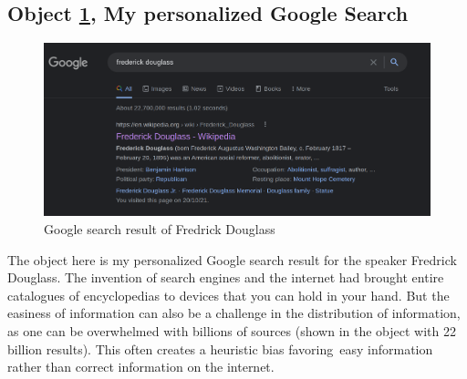 \documentclass[a4paper,11pt]{article}
\begin{document}




\subsection*{Object \ref{fig:download}, My personalized Google Search}

\begin{figure}[h!]
 \centering
 \includegraphics[scale=0.25]{douglass.png}
 \caption{Google search result of Fredrick Douglass}
 \label{fig:download}
\end{figure}

The object here is my personalized Google search result for the speaker Fredrick Douglass. The invention of search engines and the internet had brought entire catalogues of encyclopedias to devices that you can hold in your hand. But the easiness of information can also be a challenge in the distribution of information, as one can be overwhelmed with billions of sources (shown in the object with 22 billion results). This often creates a heuristic bias favoring\
easy information rather than correct information on the internet.
\end{document}
